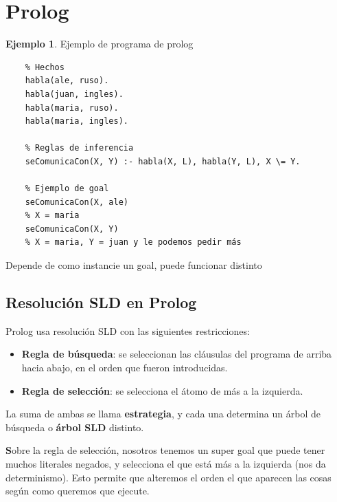 \documentclass{report}
\theoremstyle{definition} %
\newtheorem*{example*}{Ejemplo}
\newenvironment{nota}[1]
    {\begin{leftbar}\textbf{#1}}
    {\end{leftbar}}
\begin{document}
\section{Prolog}

\begin{example*} Ejemplo de programa de prolog
    \begin{verbatim}
    % Hechos
    habla(ale, ruso).
    habla(juan, ingles).
    habla(maria, ruso).
    habla(maria, ingles).

    % Reglas de inferencia
    seComunicaCon(X, Y) :- habla(X, L), habla(Y, L), X \= Y.

    % Ejemplo de goal
    seComunicaCon(X, ale)
    % X = maria
    seComunicaCon(X, Y)
    % X = maria, Y = juan y le podemos pedir más
    \end{verbatim}

    Depende de como instancie un goal, puede funcionar distinto

\end{example*}

\subsection{Resolución SLD en Prolog}

Prolog usa resolución SLD con las siguientes restricciones:

\begin{itemize}
    \item \textbf{Regla de búsqueda}: se seleccionan las cláusulas del programa
    de arriba hacia abajo, en el orden que fueron introducidas.
    \item \textbf{Regla de selección}: se selecciona el átomo de más a la
    izquierda.
\end{itemize}

La suma de ambas se llama \textbf{estrategia}, y cada una determina un árbol de
búsqueda o \textbf{árbol SLD} distinto.

\begin{nota}
    Sobre la regla de selección, nosotros tenemos un super goal que puede tener
    muchos literales negados, y selecciona el que está más a la izquierda (nos
    da determinismo). Esto permite que alteremos el orden el que aparecen las
    cosas según como queremos que ejecute.
\end{nota}
\end{document}
